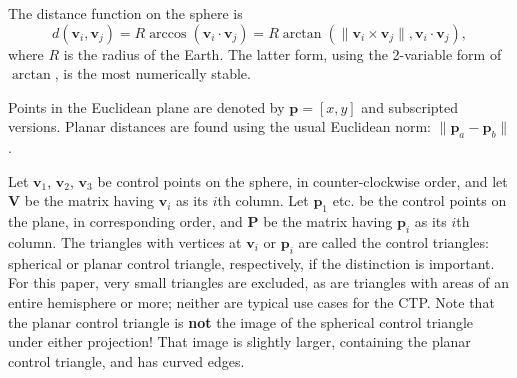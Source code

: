 \documentclass[]{interact}
\begin{document}
The distance function on the sphere is
\begin{equation}
d\left(\mathbf v_i, \mathbf v_j\right)
= R \arccos\left(\mathbf v_i \cdot \mathbf v_j\right)
= R \arctan\left(\|\mathbf v_i \times \mathbf v_j\|,
\mathbf v_i \cdot \mathbf v_j\right),
\end{equation}
where $R$ is the radius of the Earth. The latter form, using the
2-variable form of $\arctan$, is the most numerically stable.

Points in the Euclidean plane are denoted by $\mathbf p = [x, y]$ and
subscripted versions. Planar distances are found using the usual
Euclidean norm: $\|\mathbf p_a - \mathbf p_b\|$.

Let $\mathbf v_1$, $\mathbf v_2$, $\mathbf v_3$ be control points on the
sphere, in counter-clockwise order, and let $\mathbf V$ be the matrix having
$\mathbf v_i$ as its $i$th column. Let $\mathbf p_1$ etc. be the control points
on the plane, in corresponding order, and $\mathbf P$ be the matrix having
$\mathbf p_i$ as its $i$th column. The triangles with vertices at $\mathbf v_i$
or $\mathbf p_i$ are called the control triangles: spherical or planar control
triangle, respectively, if the distinction is important. For this paper,
very small triangles are excluded, as are triangles with areas of an entire
hemisphere or more; neither are typical use cases for the CTP.
Note that the planar control triangle is \textbf{not} the image of the
spherical control triangle under either projection! That image is
slightly larger, containing the planar control triangle, and has curved edges.
\end{document}
